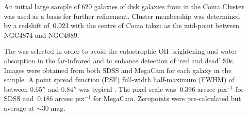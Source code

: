 An initial large sample of 620 galaxies of disk galaxies from \citet{head_dissecting_2014} in the Coma Cluster was used as a basis for further refinement. Cluster membership was determined by a redshift of $~0.023$ with the centre of Coma taken as the mid-point between NGC4874 and NGC4889.

The \iband was selected in order to avoid the catastrophic OH-brightening and water absorption in the far-infrared and to enhance detection of `red and dead' S0s. Images were obtained from both SDSS and MegaCam for each galaxy in the sample. A point spread function (PSF) full-width half-maximum (FWHM) of between $0.65''$ and $0.84''$ was typical \citep{head_dissecting_2014}. The pixel scale was $~0.396$ arcsec pix$^{-1}$ for SDSS and $~0.186$ arcsec pix$^{-1}$ for MegaCam. Zeropoints were pre-calculated but average at $\sim 30$ mag.